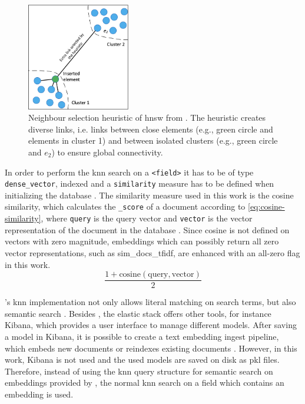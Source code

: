 \begin{figure}[htp] %
    \centering
    \includegraphics[width=0.4\textwidth]{images/HNSW-neighbour-selection-heuristic.png}
    \caption{Neighbour selection heuristic of \ac{hnsw} from \cite{Elasticsearch-kNN-HNSW}.
    The heuristic creates diverse links, i.e. links between close elements (e.g., green circle and elements in cluster 1) 
    and between isolated clusters (e.g., green circle and $e_2$) to ensure global connectivity.
    }
    \label{fig:hnsw-heuristic}
\end{figure}

In order to perform the \ac{knn} search on a \texttt{<field>} it has to be of type \texttt{dense\_vector}, indexed and a \texttt{similarity} measure has to be defined when initializing the database \cite{Elasticsearch-knn}.
The similarity measure used in this work is the cosine similarity, which calculates the \texttt{\_score} of a document according to \autoref{eq:cosine-similarity}, 
where \texttt{query} is the query vector and \texttt{vector} is the vector representation of the document in the database \cite{Elasticsearch-kNN-similarity}.
Since cosine is not defined on vectors with zero magnitude, embeddings which can possibly return all zero vector representations, such as sim\_docs\_tfidf, are enhanced with an all-zero flag in this work.
\begin{equation}
    \frac{1 + \text{cosine}(\text{query}, \text{vector})}{2}
\end{equation}
\label{eq:cosine-similarity}

\databaseName{}'s \ac{knn} implementation not only allows literal matching on search terms, but also semantic search \cite{Elasticsearch-knn}.
Besides \databaseName{}, the elastic stack offers other tools, for instance Kibana, which provides a user interface to manage different models.
After saving a model in Kibana, it is possible to create a text embedding ingest pipeline, which embeds new documents or reindexes existing documents \cite{Elasticsearch-knn-embedding}.
However, in this work, Kibana is not used and the used models are saved on disk as \ac{pkl} files.
Therefore, instead of using the \ac{knn} query structure for semantic search on embeddings provided by \databaseName{}, the normal \ac{knn} search on a field which contains an embedding is used.


